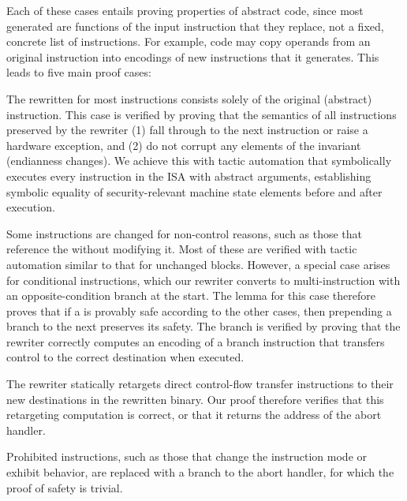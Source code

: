 Each of these cases entails proving properties of abstract code, since most generated \Blocks are functions of the input instruction that they replace, not a fixed, concrete list of instructions.
For example, \Block code may copy operands from an original instruction into encodings of new instructions that it generates.
This leads to five main proof cases:

The rewritten \Block for most instructions consists solely of the original (abstract) instruction.
This case is verified by proving that the semantics of all instructions preserved by the rewriter
(1) fall through to the next instruction or raise a hardware exception, and
(2) do not corrupt any elements of the invariant (\eg endianness changes).
We achieve this with tactic automation that symbolically executes every instruction in the ISA with abstract arguments, establishing symbolic equality of security-relevant machine state elements before and after execution.

Some instructions are changed for non-control reasons, such as those that reference the \PC without modifying it.
Most of these are verified with tactic automation similar to that for unchanged blocks.
However, a special case arises for conditional instructions, which our rewriter converts to multi-instruction \Blocks with an opposite-condition branch at the start.
The lemma for this case therefore proves that if a \Block is provably safe according to the other cases, then prepending a branch to the next \Block preserves its safety.
The branch is verified by proving that the rewriter correctly computes an encoding of a branch instruction that transfers control to the correct destination when executed.

The rewriter statically retargets direct control-flow transfer instructions to their new destinations in the rewritten binary.
Our proof therefore verifies that this retargeting computation is correct, or that it returns the address of the abort handler.

Prohibited instructions, such as those that change the instruction mode or exhibit \unpredictable{} behavior,
are replaced with a branch to the abort handler, for which the proof of safety is trivial.

